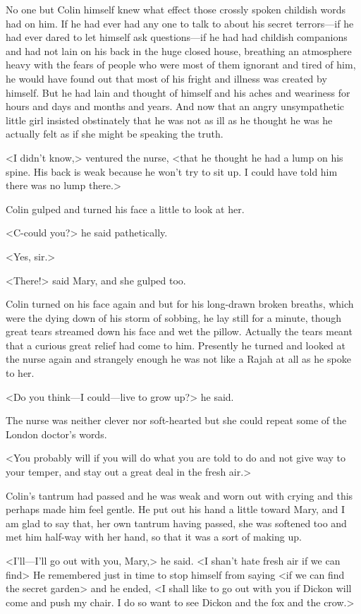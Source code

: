 No one but Colin himself knew what effect those crossly spoken childish words had on him. If he had ever had any one to talk to about his secret terrors—if he had ever dared to let himself ask questions—if he had had childish companions and had not lain on his back in the huge closed house, breathing an atmosphere heavy with the fears of people who were most of them ignorant and tired of him, he would have found out that most of his fright and illness was created by himself. But he had lain and thought of himself and his aches and weariness for hours and days and months and years. And now that an angry unsympathetic little girl insisted obstinately that he was not as ill as he thought he was he actually felt as if she might be speaking the truth.

<I didn't know,> ventured the nurse, <that he thought he had a lump on his spine. His back is weak because he won't try to sit up. I could have told him there was no lump there.>

Colin gulped and turned his face a little to look at her.

<C-could you?> he said pathetically.

<Yes, sir.>

<There!> said Mary, and she gulped too.

Colin turned on his face again and but for his long-drawn broken breaths, which were the dying down of his storm of sobbing, he lay still for a minute, though great tears streamed down his face and wet the pillow. Actually the tears meant that a curious great relief had come to him. Presently he turned and looked at the nurse again and strangely enough he was not like a Rajah at all as he spoke to her.

<Do you think—I could—live to grow up?> he said.

The nurse was neither clever nor soft-hearted but she could repeat some of the London doctor's words.

<You probably will if you will do what you are told to do and not give way to your temper, and stay out a great deal in the fresh air.>

Colin's tantrum had passed and he was weak and worn out with crying and this perhaps made him feel gentle. He put out his hand a little toward Mary, and I am glad to say that, her own tantrum having passed, she was softened too and met him half-way with her hand, so that it was a sort of making up.

<I'll—I'll go out with you, Mary,> he said. <I shan't hate fresh air if we can find\longdash> He remembered just in time to stop himself from saying <if we can find the secret garden> and he ended, <I shall like to go out with you if Dickon will come and push my chair. I do so want to see Dickon and the fox and the crow.>

